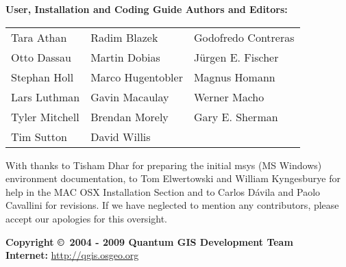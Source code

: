 \begin{flushleft}
\textbf{User, Installation and Coding Guide Authors and Editors:}
 
\begin{tabular}{p{5cm} p{5cm} p{5cm}}
Tara Athan & Radim Blazek & Godofredo Contreras \\
Otto Dassau & Martin Dobias & J\"urgen E. Fischer \\ 
Stephan Holl & Marco Hugentobler & Magnus Homann \\ 
Lars Luthman & Gavin Macaulay & Werner Macho \\
Tyler Mitchell & Brendan Morely & Gary E. Sherman \\ 
Tim Sutton & David Willis & \\
\end{tabular}

\vspace{3cm}

With thanks to Tisham Dhar for preparing the initial msys (MS Windows)
environment documentation, to Tom Elwertowski and William Kyngesburye for
help in the MAC OSX Installation Section and to Carlos D\'{a}vila and Paolo
Cavallini for revisions. If we have neglected to mention any contributors,
please accept our apologies for this oversight.

\textbf{Copyright \copyright~2004 - 2009 Quantum GIS Development Team} \\
\textbf{Internet:} \url{http://qgis.osgeo.org}
\end{flushleft}

